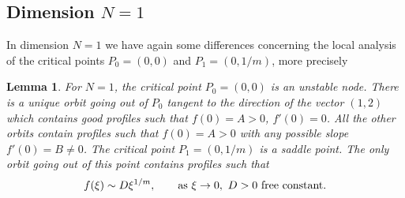 \documentclass[a4paper,11pt]{article}
\newtheorem{lemma}[theorem]{Lemma}
\numberwithin{equation}{section}
\begin{document}
\subsection{Dimension $N=1$}\label{subsec.N1}

In dimension $N=1$ we have again some differences concerning the local analysis of the critical points $P_0=(0,0)$ and $P_1=(0,1/m)$, more precisely
\begin{lemma}\label{lem.P01}
For $N=1$, the critical point $P_0=(0,0)$ is an unstable node. There is a unique orbit going out of $P_0$ tangent to the direction of the vector $(1,2)$ which contains good profiles such that $f(0)=A>0$, $f'(0)=0$. All the other orbits contain profiles such that $f(0)=A>0$ with any possible slope $f'(0)=B\neq0$. The critical point $P_1=(0,1/m)$ is a saddle point. The only orbit going out of this point contains profiles such that
\begin{equation}\label{interm24}
f(\xi)\sim D\xi^{1/m}, \qquad {\rm as} \ \xi\to0, \ D>0 \ {\rm free \ constant}.
\end{equation}
\end{lemma}
\end{document}
